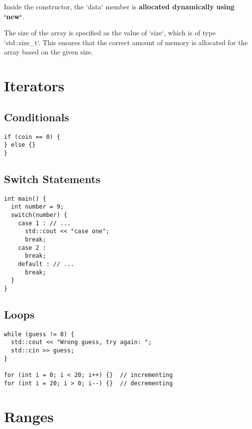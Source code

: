 \documentclass[openany]{report}
\begin{document}
Inside the constructor, the `data` member is \textbf{allocated dynamically using `new`}.

The size of the array is specified as the value of `size`, which is of type `std::size\_t`. 
This ensures that the correct amount of memory is allocated for the array based on the given size.

\section{Iterators}
\subsection{Conditionals}

\begin{verbatim}
if (coin == 0) {
} else {}
}
\end{verbatim}

\subsection{Switch Statements}

\begin{verbatim}
int main() {
  int number = 9;
  switch(number) {
    case 1 : // ...
      std::cout << "case one";
      break;
    case 2 :
      break;
    default : // ...
      break;
  }
}
\end{verbatim}

\subsection{Loops}

\begin{verbatim}
while (guess != 8) {
  std::cout << "Wrong guess, try again: ";
  std::cin >> guess;
}

for (int i = 0; i < 20; i++) {}  // incrementing
for (int i = 20; i > 0; i--) {}  // decrementing
\end{verbatim}

\section{Ranges}
\end{document}
